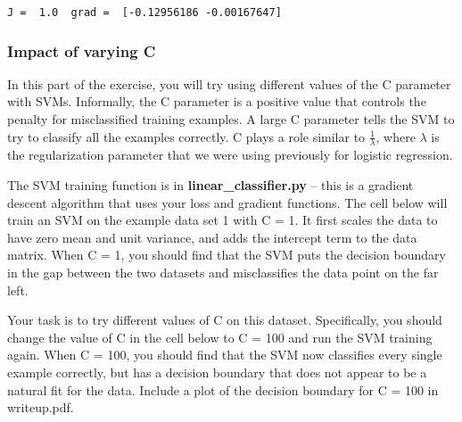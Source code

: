 \documentclass[11pt]{article}
\begin{document}
    \begin{Verbatim}[commandchars=\\\{\}]
J =  1.0  grad =  [-0.12956186 -0.00167647]

    \end{Verbatim}

    \hypertarget{impact-of-varying-c}{%
\subsubsection{Impact of varying C}\label{impact-of-varying-c}}

In this part of the exercise, you will try using different values of the
C parameter with SVMs. Informally, the C parameter is a positive value
that controls the penalty for misclassified training examples. A large C
parameter tells the SVM to try to classify all the examples correctly. C
plays a role similar to \(\frac{1}{\lambda}\), where \(\lambda\) is the
regularization parameter that we were using previously for logistic
regression.

The SVM training function is in \textbf{linear\_classifier.py} -- this
is a gradient descent algorithm that uses your loss and gradient
functions. The cell below will train an SVM on the example data set 1
with C = 1. It first scales the data to have zero mean and unit
variance, and adds the intercept term to the data matrix. When C = 1,
you should find that the SVM puts the decision boundary in the gap
between the two datasets and misclassifies the data point on the far
left.

Your task is to try different values of C on this dataset. Specifically,
you should change the value of C in the cell below to C = 100 and run
the SVM training again. When C = 100, you should find that the SVM now
classifies every single example correctly, but has a decision boundary
that does not appear to be a natural fit for the data. Include a plot of
the decision boundary for C = 100 in writeup.pdf.
\end{document}
